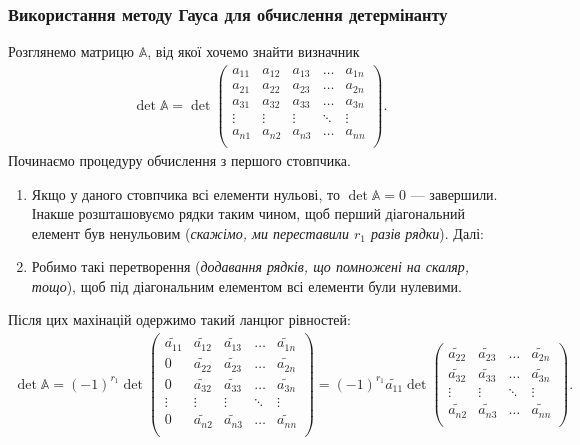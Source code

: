 \documentclass{math_library}
\begin{document}
\subsubsection*{Використання методу Гауса для обчислення детермінанту}
Розглянемо матрицю $\mathbb{A}$, від якої хочемо знайти визначник
\begin{align*}
\det \mathbb{A} = \det \begin{pmatrix} 
a_{11} & a_{12} & a_{13} & \dots & a_{1n} \\
a_{21} & a_{22} & a_{23} & \dots & a_{2n} \\
a_{31} & a_{32} & a_{33} & \dots & a_{3n} \\
\vdots & \vdots & \vdots & \ddots & \vdots \\
a_{n1} & a_{n2} & a_{n3} & \dots & a_{nn} \\
\end{pmatrix}.
\end{align*}
Починаємо процедуру обчислення з першого стовпчика.
\begin{enumerate}[nosep,wide=0pt,label={\Roman*.}]
\item Якщо у даного стовпчика всі елементи нульові, то $\det \mathbb{A} = 0$ --- завершили. Інакше розшташовуємо рядки таким чином, щоб перший діагональний елемент був ненульовим (\textit{скажімо, ми переставили $r_1$ разів рядки}). Далі:
\item Робимо такі перетворення (\textit{додавання рядків, що помножені на скаляр, тощо}), щоб під діагональним елементом всі елементи були нулевими.
\end{enumerate}
Після цих махінацій одержимо такий ланцюг рівностей:
\begin{align*}
\det \mathbb{A} = (-1)^{r_1} \det \begin{pmatrix}
\widetilde{a_{11}} & \widetilde{a_{12}} & \widetilde{a_{13}} & \dots & \widetilde{a_{1n}} \\
0 & \widetilde{a_{22}} & \widetilde{a_{23}} & \dots & \widetilde{a_{2n}} \\
0 & \widetilde{a_{32}} & \widetilde{a_{33}} & \dots & \widetilde{a_{3n}} \\
\vdots & \vdots & \vdots & \ddots & \vdots \\
0 & \widetilde{a_{n2}} & \widetilde{a_{n3}} & \dots & \widetilde{a_{nn}} \\
\end{pmatrix} = (-1)^{r_1} \widetilde{a_{11}} \det \begin{pmatrix}
\widetilde{a_{22}} & \widetilde{a_{23}} & \dots & \widetilde{a_{2n}} \\
\widetilde{a_{32}} & \widetilde{a_{33}} & \dots & \widetilde{a_{3n}} \\
\vdots & \vdots & \ddots & \vdots \\
\widetilde{a_{n2}} & \widetilde{a_{n3}} & \dots & \widetilde{a_{nn}} \\
\end{pmatrix}.
\end{align*}
\end{document}
